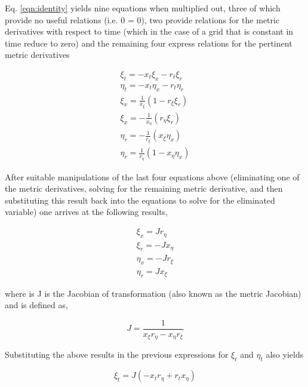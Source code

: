 	Eq. \ref{eqn:identity} yields nine equations when multiplied out, three of which provide no useful
relations (i.e. 0 = 0), two provide relations for the metric derivatives with respect to time (which in the case of a grid
that is constant in time reduce to zero) and the remaining four express relations for the pertinent metric derivatives

\begin{displaymath}
	\begin{array}{c}
	\xi_t = -x_t \xi_x - r_t \xi_r \\
	\eta_t = -x_t \eta_x - r_t \eta_r \\
	\xi_x = \frac{1}{x_\xi}(1 - r_\xi \xi_r) \\
	\xi_x = -\frac{1}{x_\eta}(r_\eta \xi_r) \\
	\eta_r = -\frac{1}{r_\xi}(x_\xi \eta_x) \\
	\eta_r = \frac{1}{r_\eta}(1 - x_\eta \eta_x)
	\end{array}
\end{displaymath}

	After suitable manipulations of the last four equations above (eliminating one of the metric derivatives, 
solving for the remaining metric derivative, and then substituting this result back into the equations to solve
for the eliminated variable) one arrives at the following results,

\begin{displaymath}
	\begin{array}{c}
	\xi_x = J r_\eta \\
	\xi_r = -J x_\eta \\
	\eta_x = -J r_\xi \\
	\eta_r = J x_\xi
	\end{array}
\end{displaymath}

	where is J is the Jacobian of transformation (also known as the metric Jacobian) and is defined as,

\begin{equation}
	J = \frac{1}{x_\xi r_\eta - x_\eta r_{\xi}}
\label{eqn:J}
\end{equation}

	Substituting the above results in the previous expressions for $\xi_t$ and $\eta_t$ also yields

\begin{equation}
	\xi_t = J(-x_t r_\eta + r_t x_\eta)
\label{eqn:xit}
\end{equation}


